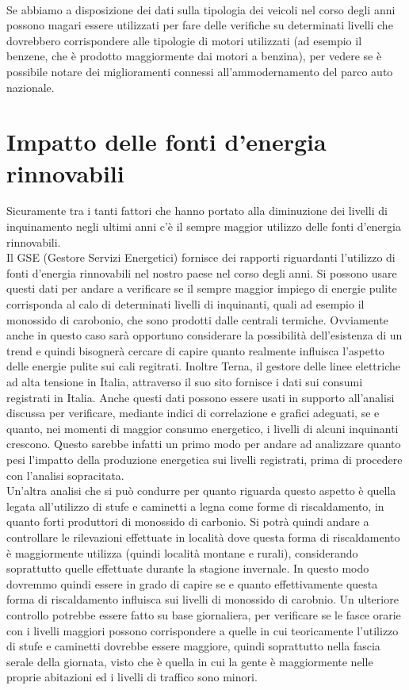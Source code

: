 \documentclass{article}
\begin{document}
\\Se abbiamo a disposizione dei dati sulla tipologia dei veicoli nel corso degli anni possono magari essere utilizzati per fare delle verifiche su determinati livelli che dovrebbero corrispondere alle tipologie di motori utilizzati (ad esempio il benzene, che è prodotto maggiormente dai motori a benzina), per vedere se è possibile notare dei miglioramenti connessi all'ammodernamento del parco auto nazionale.
\newpage

\section{Impatto delle fonti d'energia rinnovabili}
Sicuramente tra i tanti fattori che hanno portato alla diminuzione dei livelli di inquinamento negli ultimi anni c'è il sempre maggior utilizzo delle fonti d'energia rinnovabili. 
\\Il GSE (Gestore Servizi Energetici) fornisce dei rapporti riguardanti l'utilizzo di fonti d'energia rinnovabili nel nostro paese nel corso degli anni. Si possono usare questi dati per andare a verificare se il sempre maggior impiego di energie pulite corrisponda al calo di determinati livelli di inquinanti, quali ad esempio il monossido di carobonio, che sono prodotti dalle centrali termiche. Ovviamente anche in questo caso sarà opportuno considerare la possibilità dell'esistenza di un trend e quindi bisognerà cercare di capire quanto realmente influisca l'aspetto delle energie pulite sui cali regitrati. Inoltre Terna, il gestore delle linee elettriche ad alta tensione in Italia, attraverso il suo sito fornisce i dati sui consumi registrati in Italia. Anche questi dati possono essere usati in supporto all'analisi discussa per verificare, mediante indici di correlazione e grafici adeguati, se e quanto, nei momenti di maggior consumo energetico, i livelli di alcuni inquinanti crescono. Questo sarebbe infatti un primo modo per andare ad analizzare quanto pesi l'impatto della produzione energetica sui livelli registrati, prima di procedere con l'analisi sopracitata.
\\Un'altra analisi che si può condurre per quanto riguarda questo aspetto è quella legata all'utilizzo di stufe e caminetti a legna come forme di riscaldamento, in quanto forti produttori di monossido di carbonio. Si potrà quindi andare a controllare le rilevazioni effettuate in località dove questa forma di riscaldamento è maggiormente utilizza (quindi località montane e rurali), considerando soprattutto quelle effettuate durante la stagione invernale. In questo modo dovremmo quindi essere in grado di capire se e quanto effettivamente questa forma di riscaldamento influisca sui livelli di monossido di carobnio. Un ulteriore controllo potrebbe essere fatto su base giornaliera, per verificare se le fasce orarie con i livelli maggiori possono corrispondere a quelle in cui teoricamente l'utilizzo di stufe e caminetti dovrebbe essere maggiore, quindi soprattutto nella fascia serale della giornata, visto che è quella in cui la gente è maggiormente nelle proprie abitazioni ed i livelli di traffico sono minori. 
\end{document}
